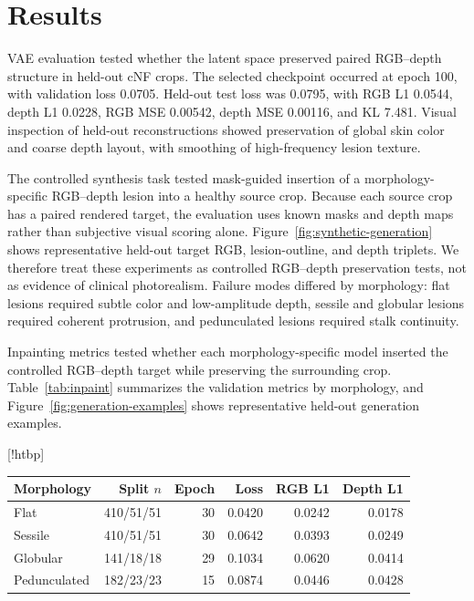 \documentclass[runningheads]{llncs}
\makeatletter
\renewenvironment{table}
               {\setlength\abovecaptionskip{10\p@}%
                \setlength\belowcaptionskip{0\p@}%
                \@float{table}}
               {\end@float}
\makeatother
\begin{document}
\section{Results}

VAE evaluation tested whether the latent space preserved paired RGB--depth structure in held-out cNF crops. The selected checkpoint occurred at epoch 100, with validation loss 0.0705. Held-out test loss was 0.0795, with RGB L1 0.0544, depth L1 0.0228, RGB MSE 0.00542, depth MSE 0.00116, and KL 7.481. Visual inspection of held-out reconstructions showed preservation of global skin color and coarse depth layout, with smoothing of high-frequency lesion texture.

The controlled synthesis task tested mask-guided insertion of a morphology-specific RGB--depth lesion into a healthy source crop. Because each source crop has a paired rendered target, the evaluation uses known masks and depth maps rather than subjective visual scoring alone. Figure~\ref{fig:synthetic-generation} shows representative held-out target RGB, lesion-outline, and depth triplets. We therefore treat these experiments as controlled RGB--depth preservation tests, not as evidence of clinical photorealism. Failure modes differed by morphology: flat lesions required subtle color and low-amplitude depth, sessile and globular lesions required coherent protrusion, and pedunculated lesions required stalk continuity.

Inpainting metrics tested whether each morphology-specific model inserted the controlled RGB--depth target while preserving the surrounding crop. Table~\ref{tab:inpaint} summarizes the validation metrics by morphology, and Figure~\ref{fig:generation-examples} shows representative held-out generation examples.

\begin{table}[!htbp]
\centering
\small
\setlength{\tabcolsep}{4pt}
\begin{tabular}{lrrrrr}
\toprule
Morphology & Split $n$ & Epoch & Loss & RGB L1 & Depth L1 \\
\midrule
Flat & 410/51/51 & 30 & 0.0420 & 0.0242 & 0.0178 \\
Sessile & 410/51/51 & 30 & 0.0642 & 0.0393 & 0.0249 \\
Globular & 141/18/18 & 29 & 0.1034 & 0.0620 & 0.0414 \\
Pedunculated & 182/23/23 & 15 & 0.0874 & 0.0446 & 0.0428 \\
\bottomrule
\end{tabular}
\caption{Best validation metrics for morphology-specific mask-guided inpainting. Split counts are train/validation/test.}
\label{tab:inpaint}
\end{table}
\end{document}
